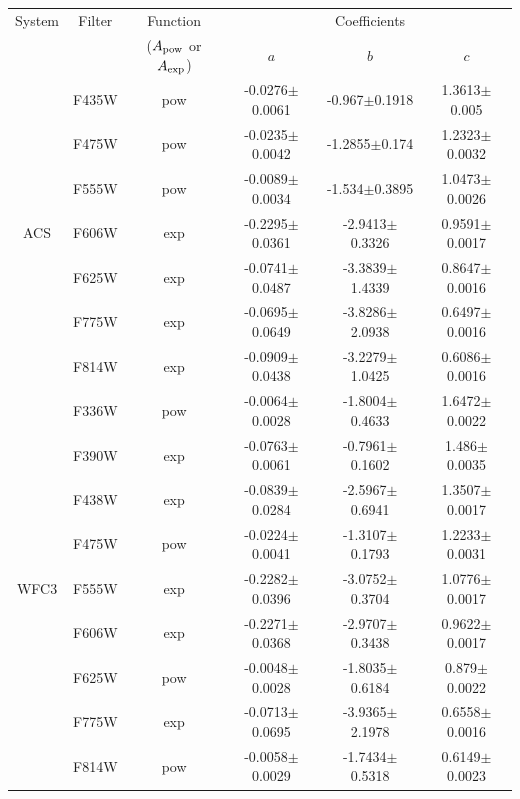 \documentclass[12pt, a4paper]{report}
\begin{document}
\begin{table}
\begin{center}
\begin{tabular}{cccccc}
\hline
System & Filter &  Function & & Coefficients & \\
 & & ($A_{\textnormal{pow}}$ or $A_{\textnormal{exp}}$) & $a$ & $b$ & $c$ \\
\hline

& F435W & pow & -0.0276$\pm$0.0061 & -0.967$\pm$0.1918 & 1.3613$\pm$0.005 \\
& F475W & pow & -0.0235$\pm$0.0042 & -1.2855$\pm$0.174 & 1.2323$\pm$0.0032 \\
& F555W & pow & -0.0089$\pm$0.0034 & -1.534$\pm$0.3895 & 1.0473$\pm$0.0026 \\
ACS & F606W & exp & -0.2295$\pm$0.0361 & -2.9413$\pm$0.3326 & 0.9591$\pm$0.0017 \\
& F625W & exp & -0.0741$\pm$0.0487 & -3.3839$\pm$1.4339 & 0.8647$\pm$0.0016 \\
& F775W & exp & -0.0695$\pm$0.0649 & -3.8286$\pm$2.0938 & 0.6497$\pm$0.0016 \\
& F814W & exp & -0.0909$\pm$0.0438 & -3.2279$\pm$1.0425 & 0.6086$\pm$0.0016 \\ \hline


& F336W & pow & -0.0064$\pm$0.0028 & -1.8004$\pm$0.4633 & 1.6472$\pm$0.0022 \\
& F390W & exp & -0.0763$\pm$0.0061 & -0.7961$\pm$0.1602 & 1.486$\pm$0.0035 \\
& F438W & exp & -0.0839$\pm$0.0284 & -2.5967$\pm$0.6941 & 1.3507$\pm$0.0017 \\
& F475W & pow & -0.0224$\pm$0.0041 & -1.3107$\pm$0.1793 & 1.2233$\pm$0.0031 \\
WFC3 & F555W & exp & -0.2282$\pm$0.0396 & -3.0752$\pm$0.3704 & 1.0776$\pm$0.0017 \\
& F606W & exp & -0.2271$\pm$0.0368 & -2.9707$\pm$0.3438 & 0.9622$\pm$0.0017 \\
& F625W & pow & -0.0048$\pm$0.0028 & -1.8035$\pm$0.6184 & 0.879$\pm$0.0022 \\
& F775W & exp & -0.0713$\pm$0.0695 & -3.9365$\pm$2.1978 & 0.6558$\pm$0.0016 \\
& F814W & pow & -0.0058$\pm$0.0029 & -1.7434$\pm$0.5318 & 0.6149$\pm$0.0023 \\ \hline


\end{tabular}
\end{center}
\end{table}
\end{document}

